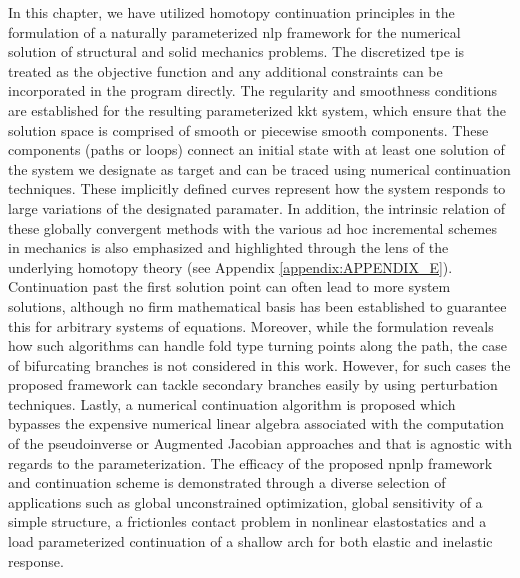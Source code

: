 In this chapter, we have utilized homotopy continuation principles in the
formulation of a naturally parameterized \acrshort{nlp} framework for
the numerical solution of structural and solid mechanics problems. The
discretized \acrshort{tpe} is treated as the objective function and any 
additional
constraints can be incorporated in the program directly. The regularity and
smoothness conditions are established for the resulting parameterized 
\acrshort{kkt}
system, which ensure that the
solution space is comprised of smooth or piecewise smooth components. These
components (paths or loops) connect an initial state with at least one solution 
of the system we designate as target and can be traced using numerical
continuation techniques. These implicitly defined curves
represent how the system responds to large variations of the designated
paramater. In addition, the intrinsic relation of these globally convergent 
methods with the various ad
hoc incremental schemes in mechanics is also emphasized and highlighted 
through the lens of the
underlying homotopy theory (see Appendix \ref{appendix:APPENDIX_E}). Continuation past 
the first 
solution point can 
often lead 
to more system solutions, although no firm mathematical basis has been
established to guarantee this for arbitrary systems of equations. Moreover, 
while the formulation reveals how such algorithms 
can handle fold type turning points along the path, the case of 
bifurcating branches is not considered in this work. However, for such cases the
proposed framework can tackle secondary branches easily by using perturbation
techniques. Lastly, a numerical continuation algorithm is proposed which
bypasses the expensive numerical linear algebra associated with the computation 
of the
pseudoinverse or Augmented Jacobian approaches and that is agnostic with regards
to the parameterization.
The efficacy of the proposed \acrshort{npnlp} framework and continuation scheme 
is
demonstrated through a diverse selection of 
applications such as global unconstrained optimization, global 
sensitivity of a simple structure, a frictionles contact problem in nonlinear
elastostatics and a load parameterized continuation of a shallow arch for both 
elastic and inelastic response.